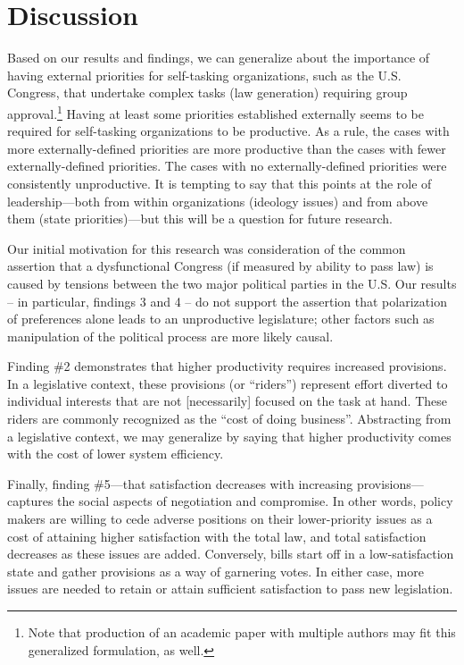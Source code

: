 \documentclass[pdftex,12pt,oribibl]{llncs}
\begin{document}
\section{Discussion}
%
Based on our results and findings, we can generalize about the importance of having external priorities for self-tasking organizations, such as the U.S. Congress, that undertake complex tasks (law generation) requiring group approval.\footnote{Note that production of an academic paper with multiple authors may fit this generalized formulation, as well.}
Having at least some priorities established externally seems to be required for self-tasking organizations to be productive. 
As a rule, the cases with more externally-defined priorities are more productive than the cases with fewer externally-defined priorities. 
The cases with no externally-defined priorities were consistently unproductive. 
It is tempting to say that this points at the role of leadership---both from within organizations (ideology issues) and from above them (state priorities)---but this will be a question for future research.

Our initial motivation for this research was consideration of the common assertion that a dysfunctional Congress (if measured by ability to pass law) is caused by tensions between the two major political parties in the U.S.
Our results -- in particular, findings 3 and 4 -- do not support the assertion that polarization of preferences alone leads to an unproductive legislature; other factors such as manipulation of the political process are more likely causal.

Finding \#2 demonstrates that higher productivity requires increased provisions.
In a legislative context, these provisions (or ``riders'') represent effort diverted to individual interests that are not [necessarily] focused on the task at hand.
These riders are commonly recognized as the ``cost of doing business''.
Abstracting from a legislative context, we may generalize by saying that higher productivity comes with the cost of lower system efficiency.

Finally, finding \#5---that satisfaction decreases with increasing provisions---captures the social aspects of negotiation and compromise.  
In other words, policy makers are willing to cede adverse positions on their lower-priority issues as a cost of attaining higher satisfaction with the total law, and total satisfaction decreases as these issues are added. 
Conversely, bills start off in a low-satisfaction state and gather provisions as a way of garnering votes.  
In either case, more issues are needed to retain or attain sufficient satisfaction to pass new legislation.
\end{document}
